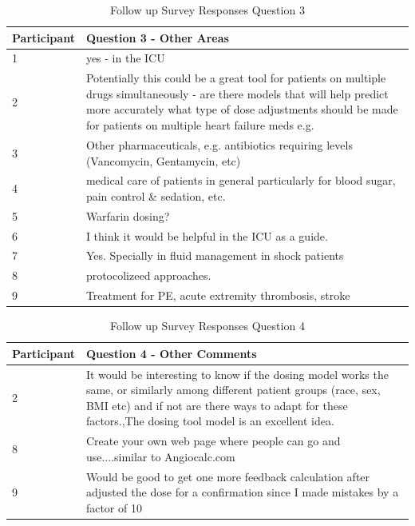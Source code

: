 \documentclass[12pt,a4paper,]{report}
\begin{document}
\begin{table}[H]
\centering
\caption{Follow up  Survey Responses Question 3}
\label{my-label}
\begin{tabularx}{\textwidth}{|l|X|}
\hline
Participant & Question 3 - Other Areas \\ \hline
1 & yes - in the ICU \\ \hline
2 & Potentially this could be a great tool for patients on multiple drugs simultaneously - are there models that will help predict more accurately what type of dose adjustments should be made for patients on multiple heart failure meds e.g. \\ \hline
3 & Other pharmaceuticals, e.g. antibiotics requiring levels (Vancomycin, Gentamycin, etc) \\ \hline
4 & medical care of patients in general particularly for blood sugar, pain control \& sedation, etc. \\ \hline
5 & Warfarin dosing? \\ \hline
6 & I think it would be helpful in the ICU as a guide. \\ \hline
7 & Yes. Specially in fluid management in shock patients \\ \hline
8 & protocolizeed approaches. \\ \hline
9 & Treatment for PE, acute extremity thrombosis, stroke \\ \hline
\end{tabularx}
\end{table}

\begin{table}[H]
\centering
\caption{Follow up  Survey Responses Question 4}
\label{my-label}
\begin{tabularx}{\textwidth}{|l|X|}
\hline
Participant & Question 4 - Other Comments \\ \hline
2 & It would be interesting to know if the dosing model works the same, or similarly among different patient groups (race, sex, BMI etc) and if not are there ways to adapt for these factors.,The dosing tool model is an excellent idea. \\ \hline
8 & Create your own web page where people can go and use....similar to Angiocalc.com \\ \hline
9 & Would be good to get one more feedback calculation after adjusted the dose for a confirmation since I made mistakes by a factor of 10 \\ \hline
\end{tabularx}
\end{table}
\end{document}
